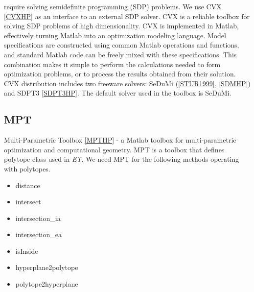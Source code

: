 \documentclass[letterpaper,10pt,english]{sphinxmanual}
\begin{document}
require solving semidefinite programming (SDP) problems.
We use CVX {\hyperref[main_source:cvxhp]{{[}CVXHP{]}}} as an interface to an external SDP solver. CVX is a
reliable toolbox for solving SDP problems of high dimensionality. CVX is
implemented in Matlab, effectively turning Matlab into an optimization
modeling language. Model specifications are constructed using common
Matlab operations and functions, and standard Matlab code can be freely
mixed with these specifications. This combination makes it simple to
perform the calculations needed to form optimization problems, or to
process the results obtained from their solution. CVX distribution
includes two freeware solvers: SeDuMi ({\hyperref[main_source:stur1999]{{[}STUR1999{]}}}, {\hyperref[main_source:sdmhp]{{[}SDMHP{]}}})
and SDPT3 {\hyperref[main_source:sdpt3hp]{{[}SDPT3HP{]}}}. The default solver used in the toolbox
is SeDuMi.


\subsection{MPT}
\label{main_source:mpt}
Multi-Parametric Toolbox {\hyperref[main_source:mpthp]{{[}MPTHP{]}}} - a
Matlab toolbox for multi-parametric optimization and computational
geometry. MPT is a toolbox that defines polytope class used in \emph{ET}. We
need MPT for the following methods operating with polytopes.
\begin{itemize}
\item {} 
distance

\item {} 
intersect

\item {} 
intersection\_ia

\item {} 
intersection\_ea

\item {} 
isInside

\item {} 
hyperplane2polytope

\item {} 
polytope2hyperplane

\end{itemize}
\end{document}
